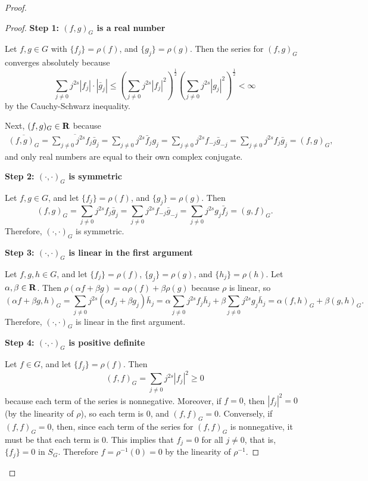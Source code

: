 \documentclass{homework}
\begin{document}
\begin{arabicparts}
\begin{proof}
\begin{proof}
			\textbf{Step 1: $(f,g)_G$ is a real number}
			
			Let $f,g \in G$ with $\{f_j\} = \rho(f)$, and $\{g_j\} = \rho(g)$. Then the series for $(f,g)_G$ converges absolutely because
			\begin{equation}
				\sum_{j\ne 0}j^{2s}|f_j|\cdot|\bar{g}_j| \le \left(\sum_{j\ne0}j^{2s}|f_j|^2\right)^\frac{1}{2}\left(\sum_{j\ne0}j^{2s}|g_j|^2\right)^\frac{1}{2} < \infty
			\end{equation}
			by the Cauchy-Schwarz inequality.
			
			Next, $(f,g)_G \in \textbf{R}$ because
			\begin{align}
				\overline{(f,g)_G} = \overline{\sum_{j\ne0}j^{2s}f_j\bar{g}_j} = \sum_{j\ne0}j^{2s}\bar{f}_jg_j = \sum_{j\ne0}j^{2s}f_{-j}\bar{g}_{-j} = \sum_{j\ne 0}j^{2s}f_j\bar{g}_j = (f,g)_G,
			\end{align}
			and only real numbers are equal to their own complex conjugate.
			
			\textbf{Step 2: $(\cdot,\cdot)_G$ is symmetric}
			
			Let $f,g \in G$, and let $\{f_j\} = \rho(f)$, and $\{g_j\} = \rho(g)$. Then
			\begin{equation}
				(f,g)_G = \sum_{j\ne0}j^{2s}f_j\bar{g}_j = \sum_{j\ne0}j^{2s}f_{-j}\bar{g}_{-j} = \sum_{j\ne0}j^{2s}g_j\bar{f}_j = (g,f)_G.
			\end{equation}
			Therefore, $(\cdot,\cdot)_G$ is symmetric.
			
			\textbf{Step 3: $(\cdot,\cdot)_G$ is linear in the first argument}
			
			Let $f,g,h\in G$, and let $\{f_j\} = \rho(f)$, $\{g_j\} = \rho(g)$, and $\{h_j\} = \rho(h)$. Let $\alpha, \beta \in \textbf{R}$. Then $\rho(\alpha f + \beta g) = \alpha\rho(f) + \beta\rho(g)$ because $\rho$ is linear, so
			\begin{equation}
				(\alpha f + \beta g, h)_G = \sum_{j\ne0}j^{2s}(\alpha f_j + \beta g_j)\bar{h}_j = \alpha\sum_{j\ne0}j^{2s}f_j\bar{h}_j + \beta \sum_{j\ne0}j^{2s}g_j\bar{h}_j = \alpha(f,h)_G + \beta(g,h)_G.
			\end{equation}
			Therefore, $(\cdot,\cdot)_G$ is linear in the first argument.
			
			\textbf{Step 4: $(\cdot,\cdot)_G$ is positive definite}
			
			Let $f \in G$, and let $\{f_j\} = \rho(f)$. Then
			\begin{equation}
				(f,f)_G = \sum_{j\ne 0} j^{2s}|f_j|^2 \ge 0
			\end{equation}
			because each term of the series is nonnegative. Moreover, if $f = 0$, then $|f_j|^2=0$ (by the linearity of $\rho$), so each term is 0, and $(f,f)_G = 0$. Conversely, if $(f,f)_G = 0$, then, since each term of the series for $(f,f)_G$ is nonnegative, it must be that each term is 0. This implies that $f_j = 0$ for all $j\ne 0$, that is, $\{f_j\} = 0$ in $S_G$. Therefore $f = \rho^{-1}(0) = 0$ by the linearity of $\rho^{-1}$.
			

\end{proof}
\end{proof}
\end{arabicparts}
\end{document}
